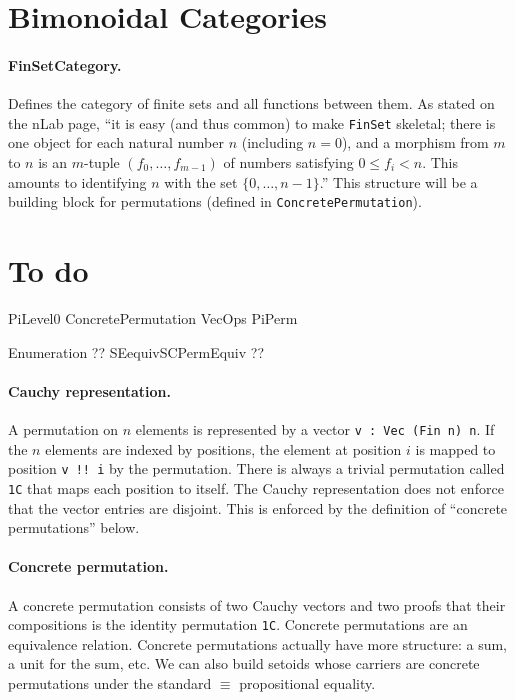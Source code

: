 \documentclass{article}
\begin{document}
\section{Bimonoidal Categories} 

\paragraph*{FinSetCategory.} Defines the category of finite sets and
all functions between them. As stated on the nLab page, ``it is easy
(and thus common) to make \texttt{FinSet} skeletal; there is one
object for each natural number $n$ (including $n=0$), and a morphism
from $m$ to $n$ is an $m$-tuple $(f_0,\ldots,f_{m−1})$ of numbers
satisfying $0 \leq f_i < n$. This amounts to identifying $n$ with the
set $\{0,\ldots,n−1\}$.'' This structure will be a building block for
permutations (defined in \texttt{ConcretePermutation}).

\section{To do}

PiLevel0
ConcretePermutation
VecOps
PiPerm

Enumeration ??
SEequivSCPermEquiv ??

\paragraph*{Cauchy representation.} A permutation on $n$ elements is
represented by a vector \texttt{v : Vec (Fin n) n}. If the $n$
elements are indexed by positions, the element at position $i$ is
mapped to position \texttt{v !! i} by the permutation. There is always
a trivial permutation called \texttt{1C} that maps each position to
itself. The Cauchy representation does not enforce that the vector
entries are disjoint. This is enforced by the definition of ``concrete
permutations'' below.

\paragraph*{Concrete permutation.} A concrete permutation consists of
two Cauchy vectors and two proofs that their compositions is the
identity permutation \texttt{1C}. Concrete permutations are an
equivalence relation. Concrete permutations actually have more
structure: a sum, a unit for the sum, etc. We can also build setoids
whose carriers are concrete permutations under the standard $\equiv$
propositional equality.

\end{document}
